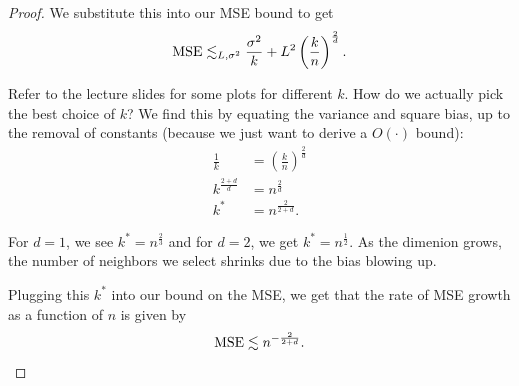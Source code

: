 \begin{proof}
	We substitute this into our MSE bound to get \[
		\operatorname{MSE} \lesssim_{L ,\sigma^2} \frac{\sigma^2}{k} + L^2 \left( \frac{k}{n} \right)^{\frac{2}{d}}
	.\] 

	Refer to the lecture slides for some plots for different $k$. How do we actually pick the best choice of $k$? We find this by equating the variance and square bias, up to the removal of constants (because we just want to derive a $O(\cdot )$ bound):
	\begin{align*}
		\frac{1}{k} &= \left( \frac{k}{n} \right)^{\frac{2}{d}} \\
		k^{\frac{2+d}{d}} &=  n^{\frac{2}{d}} \\
		k^* &= n^{\frac{2}{2+d}}
	.\end{align*}

	For $d=1$, we see $k^* = n^{\frac{2}{3}}$ and for $d=2$, we get $k^* = n^{\frac{1}{2}}$. As the dimenion grows, the number of neighbors we select shrinks due to the bias blowing up.

	Plugging this $k^*$ into our bound on the MSE, we get that the rate of MSE growth as a function of $n$ is given by \[
		\operatorname{MSE} \lesssim n^{-\frac{2}{2+d}}
	.\]
\end{proof}

